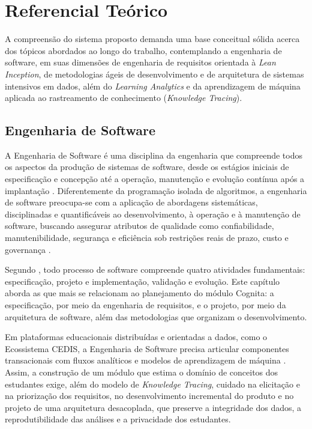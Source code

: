 
\chapter[Referencial Teórico]{Referencial Teórico}
\label{cap:referencial}

A compreensão do sistema proposto demanda uma base conceitual sólida acerca dos tópicos abordados ao longo do trabalho, contemplando a engenharia de software, em suas dimensões de engenharia de requisitos orientada à \textit{Lean Inception}, de metodologias ágeis de desenvolvimento e de arquitetura de sistemas intensivos em dados, além do \textit{Learning Analytics} e da aprendizagem de máquina aplicada ao rastreamento de conhecimento (\textit{Knowledge Tracing}).

\section{Engenharia de Software}
\label{sec:engenharia-software}

A Engenharia de Software é uma disciplina da engenharia que compreende todos os aspectos da produção de sistemas de software, desde os estágios iniciais de especificação e concepção até a operação, manutenção e evolução contínua após a implantação \cite{sommerville_engenharia_2019}. Diferentemente da programação isolada de algoritmos, a engenharia de software preocupa-se com a aplicação de abordagens sistemáticas, disciplinadas e quantificáveis ao desenvolvimento, à operação e à manutenção de software, buscando assegurar atributos de qualidade como confiabilidade, manutenibilidade, segurança e eficiência sob restrições reais de prazo, custo e governança \cite{bourque_guide_2014, pressman_engenharia_2021}.

Segundo , todo processo de software compreende quatro atividades fundamentais: especificação, projeto e implementação, validação e evolução. Este capítulo aborda as que mais se relacionam ao planejamento do módulo Cognita: a especificação, por meio da engenharia de requisitos, e o projeto, por meio da arquitetura de software, além das metodologias que organizam o desenvolvimento.

Em plataformas educacionais distribuídas e orientadas a dados, como o Ecossistema CEDIS, a Engenharia de Software precisa articular componentes transacionais com fluxos analíticos e modelos de aprendizagem de máquina \cite{kleppmann_designing_2017}. Assim, a construção de um módulo que estima o domínio de conceitos dos estudantes exige, além do modelo de \textit{Knowledge Tracing}, cuidado na elicitação e na priorização dos requisitos, no desenvolvimento incremental do produto e no projeto de uma arquitetura desacoplada, que preserve a integridade dos dados, a reprodutibilidade das análises e a privacidade dos estudantes.

